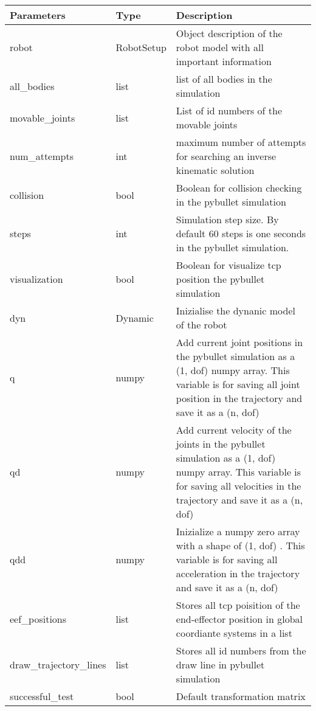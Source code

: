 \documentclass[
	ngerman,
	accentcolor=9c,%
	type=intern,
	marginpar=false
	]{tudapub}
\begin{document}
\vspace{0.5cm}
\begin{tabular}{|p{}| p{}| p{}|}
\hline
\textbf{Parameters} & \textbf{Type} & \textbf{Description} \\
\hline
robot & RobotSetup & Object description of the robot model with all important information \\
\hline
all\_bodies & list & list of all bodies in the simulation \\
\hline
movable\_joints & list & List of id numbers of the movable joints \\
\hline
num\_attempts & int & maximum number of attempts for searching an inverse kinematic solution \\
\hline
collision & bool & Boolean for collision checking in the pybullet simulation \\
\hline
steps & int & Simulation step size. By default 60 steps is one seconds in the pybullet simulation. \\
\hline
visualization & bool & Boolean for visualize tcp position the pybullet simulation \\
\hline
dyn & Dynamic & Inizialise the dynanic model of the robot \\
\hline
q & numpy & Add current joint positions in the pybullet simulation as a (1, dof) numpy array. This variable is for saving all joint position in the trajectory and save it as a (n, dof)\\
\hline
qd & numpy & Add current velocity of the joints in the pybullet simulation as a (1, dof) numpy array. This variable is for saving all velocities  in the trajectory and save it as a (n, dof) \\
\hline
qdd & numpy & Inizialize a numpy zero array  with a shape of  (1, dof) . This variable is for saving all acceleration in the trajectory and save it as a (n, dof) \\
\hline
eef\_positions & list & Stores all tcp poisition of the end-effector position in global coordiante systems in a list \\
\hline
draw\_trajectory\_lines & list & Stores all id numbers from the draw line in pybullet simulation \\
\hline
successful\_test & bool & Default transformation matrix\\
\hline
\end{tabular}



\vspace{1cm}
\end{document}
